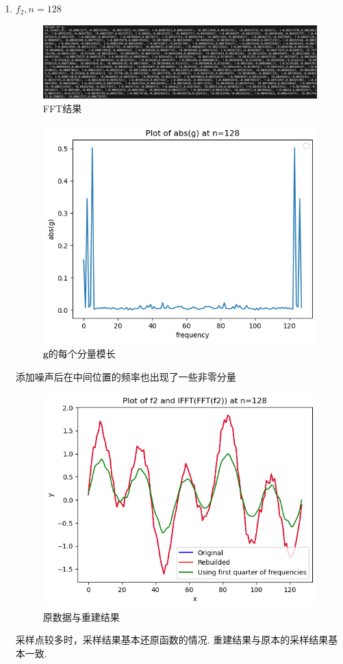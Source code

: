 \documentclass[UTF8]{ctexart}
\begin{document}
\begin{enumerate}
  \item $f_2, n=128$
\begin{figure}[H]
    \centering
    \includegraphics[scale=0.3]{g_3.png}
    \caption{FFT结果}
\end{figure}
\begin{figure}[H]
  \centering
  \includegraphics[scale=0.5]{g_abs_3.png}
  \caption{$\mathbf{g}$的每个分量模长}
\end{figure}
添加噪声后在中间位置的频率也出现了一些非零分量
\begin{figure}[H]
  \centering
  \includegraphics[scale=0.5]{res_3.png}
  \caption{原数据与重建结果}
\end{figure}
采样点较多时，采样结果基本还原函数的情况. 重建结果与原本的采样结果基本一致.
\end{enumerate}
\end{document}
